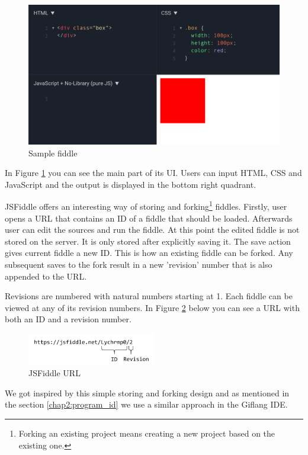 {\begin{figure}[!hbt]
    \centering
	\includegraphics[width=\textwidth]{../img/jsfiddle}
	\caption{Sample fiddle}
	\label{fig:chap1:jsfiddle}
\end{figure}

In Figure \ref{fig:chap1:jsfiddle} you can see the main part of its UI. Users can input HTML, CSS and JavaScript and the output is displayed in the
bottom right quadrant.

JSFiddle offers an interesting way of storing and forking\footnote{Forking an existing project means creating a new project based on the existing one.}
fiddles. Firstly, user opens a URL that contains an ID of a fiddle that should be loaded. Afterwards user can edit the sources and run the fiddle.
At this point the edited fiddle is not stored on the server. It is only stored after explicitly saving it. The save action gives current fiddle a new ID.
This is how an existing fiddle can be forked. Any subsequent saves to the fork result in a  new 'revision' number that is also appended to the URL.

Revisions are numbered with natural numbers starting at 1. Each fiddle can be viewed at any of its revision numbers. In Figure \ref{fig:chap1:jsfiddle_url}
below you can see a URL with both an ID and a revision number.
\begin{figure}[!hbt]
    \centering
	\includegraphics[width=0.5\textwidth]{../img/jsfiddle_url}
	\caption{JSFiddle URL}
	\label{fig:chap1:jsfiddle_url}
\end{figure}

We got inspired by this simple storing and forking design and as mentioned in the section \ref{chap2:program_id} we use a similar approach in the Giflang IDE.

}

